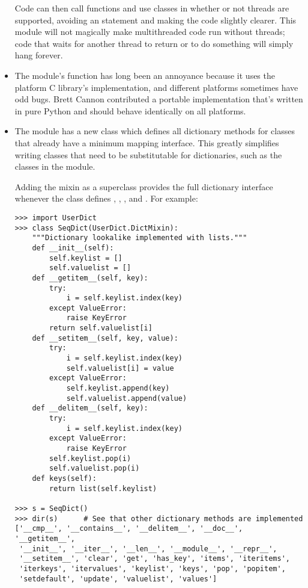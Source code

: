 \documentclass{howto}
\begin{document}
\begin{itemize}
Code can then call functions and use classes in 
whether or not threads are supported, avoiding an 
statement and making the code slightly clearer.  This module will not
magically make multithreaded code run without threads; code that waits
for another thread to return or to do something will simply hang
forever.

\item The  module's  function has
long been an annoyance because it uses the platform C library's
 implementation, and different platforms
sometimes have odd bugs.  Brett Cannon contributed a portable
implementation that's written in pure Python and should behave
identically on all platforms.

\item The  module has a new  class which
defines all dictionary methods for classes that already have a minimum
mapping interface.  This greatly simplifies writing classes that need
to be substitutable for dictionaries, such as the classes in 
the  module.
 
Adding the mixin as a superclass provides the full dictionary
interface whenever the class defines ,
, , and .
For example:
 
\begin{verbatim}
>>> import UserDict
>>> class SeqDict(UserDict.DictMixin):
    """Dictionary lookalike implemented with lists."""
    def __init__(self):
        self.keylist = []
        self.valuelist = []
    def __getitem__(self, key):
        try:
            i = self.keylist.index(key)
        except ValueError:
            raise KeyError
        return self.valuelist[i]
    def __setitem__(self, key, value):
        try:
            i = self.keylist.index(key)
            self.valuelist[i] = value
        except ValueError:
            self.keylist.append(key)
            self.valuelist.append(value)
    def __delitem__(self, key):
        try:
            i = self.keylist.index(key)
        except ValueError:
            raise KeyError
        self.keylist.pop(i)
        self.valuelist.pop(i)
    def keys(self):
        return list(self.keylist)

>>> s = SeqDict()
>>> dir(s)      # See that other dictionary methods are implemented
['__cmp__', '__contains__', '__delitem__', '__doc__', '__getitem__',
 '__init__', '__iter__', '__len__', '__module__', '__repr__',
 '__setitem__', 'clear', 'get', 'has_key', 'items', 'iteritems',
 'iterkeys', 'itervalues', 'keylist', 'keys', 'pop', 'popitem',
 'setdefault', 'update', 'valuelist', 'values']
\end{verbatim}


\end{itemize}
\end{document}

